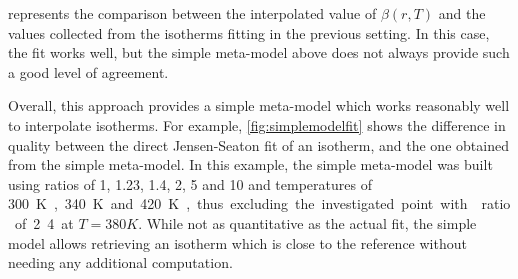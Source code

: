 \documentclass[main.tex]{subfiles}
\begin{document}
 represents the comparison between the interpolated value of $\beta(r, T)$ and the values collected from the isotherms fitting in the previous setting. In this case, the fit works well, but the simple meta-model above does not always provide such a good level of agreement.

Overall, this approach provides a simple meta-model which works reasonably well to interpolate isotherms. For example, \cref{fig:simplemodelfit} shows the difference in quality between the direct Jensen-Seaton fit of an isotherm, and the one obtained from the simple meta-model. In this example, the simple meta-model was built using \SiAl ratios of 1, 1.23, 1.4, 2, 5 and 10 and temperatures of \qty{300}K, \qty{340}K and \qty{420}K, thus excluding the investigated point with \SiAl ratio of 2.4 at $T = \qty{380}K$. While not as quantitative as the actual fit, the simple model allows retrieving an isotherm which is close to the reference without needing any additional computation.
\end{document}
